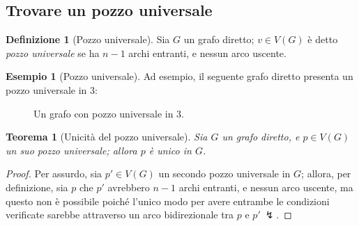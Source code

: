 \documentclass[14pt]{extreport}
\newtheorem{theorem}{Teorema}[subsection]
\theoremstyle{definition}
\newtheorem{definition}{Definizione}[subsection]
\theoremstyle{definition}
\newtheorem{example}{Esempio}[subsection]
\begin{document}
\subsection{Trovare un pozzo universale}

\begin{definition}[Pozzo universale]
    Sia $G$ un grafo diretto; $v \in V(G)$ è detto \textit{pozzo universale} se ha $n - 1$ archi entranti, e nessun arco uscente.
\end{definition}

\begin{example}[Pozzo universale]
    Ad esempio, il seguente grafo diretto presenta un pozzo universale in $3$:

    \begin{figure}[H]
        \centering
        \caption{Un grafo con pozzo universale in $3$.}
    \end{figure}
\end{example}

\begin{theorem}[Unicità del pozzo universale]
    Sia $G$ un grafo diretto, e $p \in V(G)$ un suo pozzo universale; allora $p$ è unico in $G$.
\end{theorem}

\begin{proof}
    Per assurdo, sia $p' \in V(G)$ un secondo pozzo universale in $G$; allora, per definizione, sia $p$ che $p'$ avrebbero $n - 1$ archi entranti, e nessun arco uscente, ma questo non è possibile poiché l'unico modo per avere entrambe le condizioni verificate sarebbe attraverso un arco bidirezionale tra $p$ e $p' \ \lightning$.
\end{proof}
\end{document}
